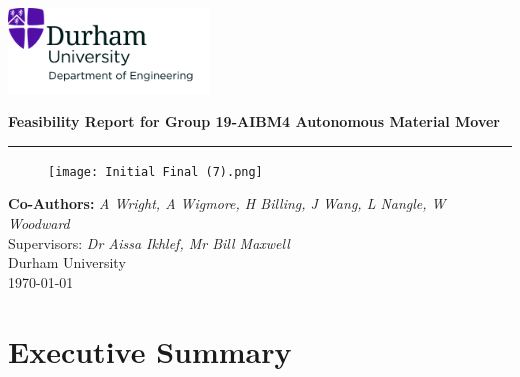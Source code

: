 \documentclass[12pt,titlepage]{article}
\begin{document}



 
\begin{titlepage}
\centering
\includegraphics[width=0.4\textwidth]{UoD_Engineering.jpg} \\
\vspace{10mm}

{\LARGE \textbf{Feasibility Report for Group 19-AIBM4 Autonomous Material Mover}} \\[10pt]

\vspace{5mm}\hrule\vspace{0mm}

\begin{figure}[h!]
    \centering
     \texttt{[image: Initial Final (7).png]}
\end{figure}  
\vspace{0mm}
\vspace{10mm}

{\large \textbf{Co-Authors: }\textit{A Wright, A Wigmore, H Billing, J Wang, L Nangle, \newline W Woodward}} \\ \vspace{1mm}
{Supervisors:\textit{ Dr Aissa Ikhlef, Mr Bill Maxwell}} \\[10pt]
{\small Durham University \\ \today}
\end{titlepage}
\addtocounter{page}{1}

\section*{Executive Summary}
\end{document}

